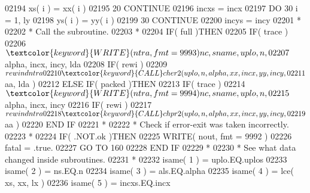 \begin{DoxyCode}
02194                         xs( i ) = xx( i )
02195    20                \textcolor{keywordflow}{CONTINUE}
02196                      incxs = incx
02197                      \textcolor{keywordflow}{DO} 30 i = 1, ly
02198                         ys( i ) = yy( i )
02199    30                \textcolor{keywordflow}{CONTINUE}
02200                      incys = incy
02201 \textcolor{comment}{*}
02202 \textcolor{comment}{*                    Call the subroutine.}
02203 \textcolor{comment}{*}
02204                      \textcolor{keywordflow}{IF}( full )\textcolor{keywordflow}{THEN}
02205                         \textcolor{keywordflow}{IF}( trace )
02206      $                     \textcolor{keyword}{WRITE}( ntra, fmt = 9993 )nc, sname, uplo, n,
02207      $                     alpha, incx, incy, lda
02208                         \textcolor{keywordflow}{IF}( rewi )
02209      $                     rewind ntra
02210                         \textcolor{keyword}{CALL }cher2( uplo, n, alpha, xx, incx, yy, incy,
02211      $                              aa, lda )
02212                      \textcolor{keywordflow}{ELSE} \textcolor{keywordflow}{IF}( packed )\textcolor{keywordflow}{THEN}
02213                         \textcolor{keywordflow}{IF}( trace )
02214      $                     \textcolor{keyword}{WRITE}( ntra, fmt = 9994 )nc, sname, uplo, n,
02215      $                     alpha, incx, incy
02216                         \textcolor{keywordflow}{IF}( rewi )
02217      $                     rewind ntra
02218                         \textcolor{keyword}{CALL }chpr2( uplo, n, alpha, xx, incx, yy, incy,
02219      $                              aa )
02220 \textcolor{keywordflow}{                     END IF}
02221 \textcolor{comment}{*}
02222 \textcolor{comment}{*                    Check if error-exit was taken incorrectly.}
02223 \textcolor{comment}{*}
02224                      \textcolor{keywordflow}{IF}( .NOT.ok )\textcolor{keywordflow}{THEN}
02225                         \textcolor{keyword}{WRITE}( nout, fmt = 9992 )
02226                         fatal = .true.
02227                         \textcolor{keywordflow}{GO TO} 160
02228 \textcolor{keywordflow}{                     END IF}
02229 \textcolor{comment}{*}
02230 \textcolor{comment}{*                    See what data changed inside subroutines.}
02231 \textcolor{comment}{*}
02232                      isame( 1 ) = uplo.EQ.uplos
02233                      isame( 2 ) = ns.EQ.n
02234                      isame( 3 ) = als.EQ.alpha
02235                      isame( 4 ) = lce( xs, xx, lx )
02236                      isame( 5 ) = incxs.EQ.incx

\end{DoxyCode}
